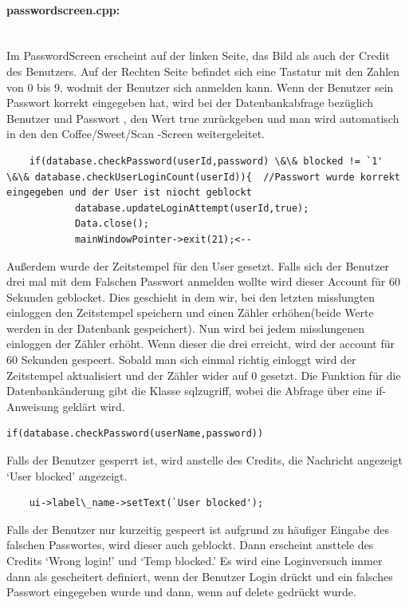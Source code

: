 \documentclass[11pt,a4paper]{article} %
\begin{document}
\paragraph{passwordscreen.cpp:} $\;$ \\
	Im PasswordScreen erscheint auf der linken Seite, das Bild als auch der Credit des Benutzers. Auf der Rechten Seite befindet sich eine Tastatur mit den Zahlen von 0 bis 9, wodmit der Benutzer sich anmelden kann.
	Wenn der Benutzer sein Passwort korrekt eingegeben hat, wird bei der Datenbankabfrage bezüglich Benutzer und Passwort , den Wert true zurückgeben und man wird automatisch in den den Coffee/Sweet/Scan -Screen weitergeleitet.
	\begin{frame}

\begin{lstlisting}
	if(database.checkPassword(userId,password) \&\& blocked != `1' \&\& database.checkUserLoginCount(userId)){  //Passwort wurde korrekt eingegeben und der User ist niocht geblockt
            database.updateLoginAttempt(userId,true);
            Data.close();
            mainWindowPointer->exit(21);<--
            \end{lstlisting}
\end{frame}
\par			
	Außerdem wurde der Zeitstempel für den User gesetzt. 
	Falls sich der Benutzer drei mal mit dem Falschen Passwort anmelden wollte wird dieser Account für 60 Sekunden geblocket.
	Dies geschieht in dem wir, bei den letzten misslungten einloggen den Zeitstempel speichern und einen Zähler erhöhen(beide Werte werden in der Datenbank gespeichert).
	Nun wird bei jedem misslungenen einloggen der Zähler erhöht. Wenn dieser die drei erreicht, wird der account für 60 Sekunden gespeert.
	Sobald man sich einmal richtig einloggt wird der Zeitstempel aktualisiert und der Zähler wider auf 0 gesetzt. Die Funktion für die Datenbankänderung gibt die Klasse sqlzugriff, wobei die Abfrage über eine if-Anweisung geklärt wird.
	
	\begin{frame}

\begin{lstlisting}
if(database.checkPassword(userName,password))
\end{lstlisting}
\end{frame}
\par	
	Falls der Benutzer gesperrt ist, wird anstelle des Credits, die Nachricht angezeigt `User blocked' angezeigt.
	
	\begin{frame}

\begin{lstlisting}
	ui->label\_name->setText(`User blocked');
	\end{lstlisting}
\end{frame}
	Falls der Benutzer nur kurzeitig gespeert ist aufgrund zu häufiger Eingabe des falschen Passwortes, wird dieser auch geblockt.
	Dann erscheint ansttele des Credits `Wrong login!' und `Temp blocked.'
	Es wird eine Loginversuch immer dann als gescheitert definiert, wenn der Benutzer Login drückt und ein falsches Passwort eingegeben wurde und dann, wenn auf delete gedrückt wurde.
\par	
\end{document}
